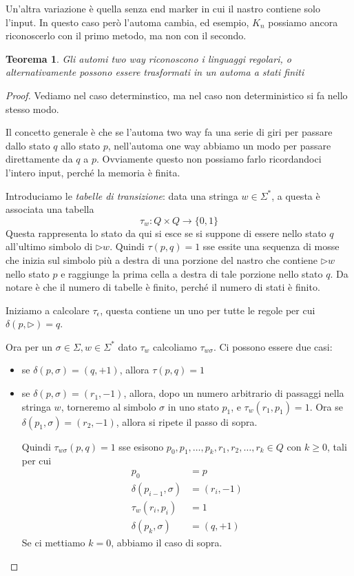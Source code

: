\documentclass[12pt]{article}
\newtheorem{teorema}{Teorema}
\begin{document}
Un'altra variazione è quella senza end marker in cui il nastro contiene solo l'input.
In questo caso però l'automa cambia, ed esempio, $K_n$ possiamo ancora riconoscerlo con il primo metodo, ma non con il secondo.

\begin{teorema}
	Gli automi two way riconoscono i linguaggi regolari, o alternativamente possono essere trasformati in un automa a stati finiti 
\end{teorema}
\begin{proof}
	Vediamo nel caso determinstico, ma nel caso non deterministico si fa nello stesso modo.

	Il concetto generale è che se l'automa two way fa una serie di giri per passare dallo stato $q$ allo stato $p$, nell'automa one way abbiamo un modo per passare direttamente da $q$ a $p$.
	Ovviamente questo non possiamo farlo ricordandoci l'intero input, perché la memoria è finita.

	Introduciamo le \textit{tabelle di transizione}: data una stringa $w \in \Sigma^*$, a questa è associata una tabella
	$$ \tau_w : Q \times Q \rightarrow \{0, 1\} $$
	Questa rappresenta lo stato da qui si esce se si suppone di essere nello stato $q$ all'ultimo simbolo di $\rhd w$.
	Quindi $\tau(p, q) = 1$ sse essite una sequenza di mosse che inizia sul simbolo più a destra di una porzione del nastro che contiene $\rhd w$ nello stato $p$ e raggiunge la prima cella a destra di tale porzione nello stato $q$.
	Da notare è che il numero di tabelle è finito, perché il numero di stati è finito.

	Iniziamo a calcolare $\tau_\epsilon$, questa contiene un uno per tutte le regole per cui $\delta(p, \rhd) = q$.

	Ora per un $\sigma \in \Sigma, w \in \Sigma^*$ dato $\tau_w$ calcoliamo $\tau_{w\sigma}$.
	Ci possono essere due casi:
	\begin{itemize}
		\item se $\delta(p, \sigma) = (q, +1)$, allora $\tau(p, q) = 1$
		\item se $\delta(p, \sigma) = (r_1, -1)$, allora, dopo un numero arbitrario di passaggi nella stringa $w$, torneremo al simbolo $\sigma$ in uno stato $p_1$, e $\tau_w(r_1, p_1) = 1$.
			Ora se $\delta(p_1, \sigma) = (r_2, -1)$, allora si ripete il passo di sopra.

			Quindi $\tau_{w\sigma}(p, q) = 1$ sse esisono $p_0, p_1, \dots, p_k, r_1, r_2, \dots, r_k \in Q$ con $k \geq 0$, tali per cui 
			\begin{align*}
				p_0 &= p \\
				\delta(p_{i - 1}, \sigma) &= (r_i, - 1) \\
				\tau_w(r_i, p_i) &= 1 \\
				\delta(p_k, \sigma) &= (q, + 1)
			\end{align*}
			Se ci mettiamo $k = 0$, abbiamo il caso di sopra.
	\end{itemize}


\end{proof}
\end{document}
